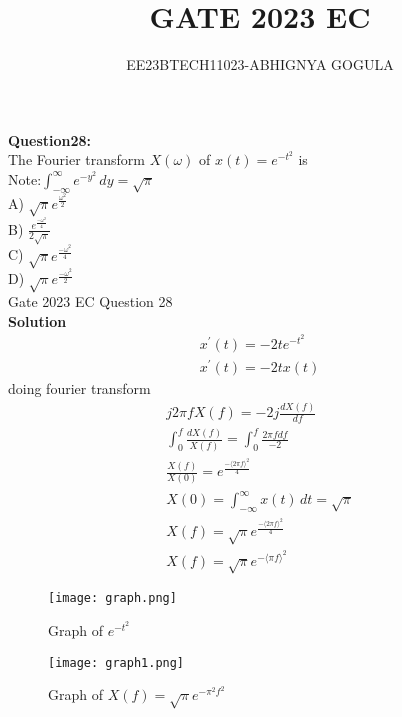 \documentclass[journal,12pt,twocolumn]{IEEEtran}
\newcommand{\brak}[1]{\langle #1 \rangle}
\theoremstyle{remark}
\begin{document}

\vspace{3cm}
\title{\textbf{GATE 2023 EC}}
\author{EE23BTECH11023-ABHIGNYA GOGULA}
\maketitle
\newpage
\bigskip
\renewcommand{\thefigure}{\theenumi}
\renewcommand{\thetable}{\theenumi}
\textbf{Question28:}
\\
 The Fourier transform $X(\omega)$ of $x(t) = e^{-t^2}$ is\\
Note:$\int_{-\infty}^{\infty} e^{-y^2} \,dy = \sqrt{\pi}$ \\  
A) $\sqrt{\pi} e^{\frac{\omega^2}{2}}$ \\
B) $\frac{e^{\frac{-\omega^2}{4}}}{2\sqrt{\pi}}$ \\
C) $\sqrt{\pi} e^{\frac{-\omega^2}{4}}$ \\
D) $\sqrt{\pi} e^{\frac{-\omega^2}{2}}$\\
\hfill Gate 2023 EC Question 28\\
\textbf{Solution}
\begin{align}
x^{'}(t)=-2te^{-t^{2}}\\
x^{'}(t)=-2tx(t)
\end{align}
doing fourier transform 
\begin{align}
j 2 \pi f X(f)= -2j\frac{d X(f)}{df}\\
\int_{0}^{f} \frac{d X(f)}{X(f)}=\int_{0}^{f} \frac{2 \pi f df}{-2}\\
\frac{X(f)}{X(0)}=e^{\frac{-\brak {2 \pi f}^{2}}{4}}\\
X(0)=\int_{-\infty}^{\infty} x(t)\,dt = \sqrt{\pi}\\
X(f)=\sqrt{\pi}e^{\frac{-\brak {2 \pi f}^2}{4}}\\
X(f)=\sqrt{\pi}e^{-\brak{\pi f}^2}
\end{align}
\begin{figure}[h]
    \centering
    \texttt{[image: graph.png]}
    \caption{Graph of $e^{-t^2}$}
    \label{fig:plot}
\end{figure}
\begin{figure}[h]
    \centering
    \texttt{[image: graph1.png]}
    \caption{Graph of $X(f) = \sqrt{\pi}e^{-\pi^2f^2}$}
    \label{fig:plot}
\end{figure}
\end{document}
